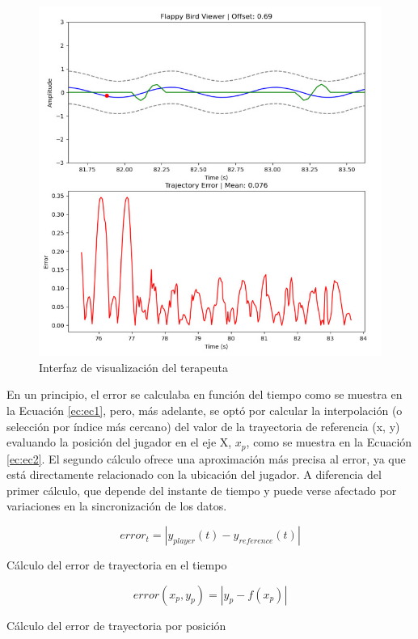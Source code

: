 \begin{figure}[ht!]
	\centering
	\begin{minipage}{0.80\linewidth}
		\centering
		\includegraphics[width=\linewidth]{figs/visual.png}
	\end{minipage}
	\caption[Interfaz de visualización del terapeuta]{Interfaz de visualización del terapeuta}
	\label{fig:visual}
\end{figure}

En un principio, el error se calculaba en función del tiempo como se muestra en la Ecuación \ref{ec:ec1}, pero, más adelante, se optó por calcular la interpolación (o selección por índice más cercano) del valor de la trayectoria de referencia (x, y) evaluando la posición del jugador en el eje X, $x_p$, como se muestra en la Ecuación \ref{ec:ec2}.
El segundo cálculo ofrece una aproximación más precisa al error, ya que está directamente relacionado con la ubicación del jugador.
A diferencia del primer cálculo, que depende del instante de tiempo y puede verse afectado por variaciones en la sincronización de los datos.

\begin{myequation}[h]
\begin{equation}
error_t = | y_{player}(t) - y_{reference}(t) |
\nonumber
\label{ec:ec1}
\end{equation}
\caption[Cálculo del error de trayectoria en el tiempo]{Cálculo del error de trayectoria en el tiempo}

\begin{equation}
error(x_p, y_p) = | y_p - f(x_p) |
\nonumber
\label{ec:ec2}
\end{equation}
\caption[Cálculo del error de trayectoria por posición]{Cálculo del error de trayectoria por posición}
\end{myequation}

